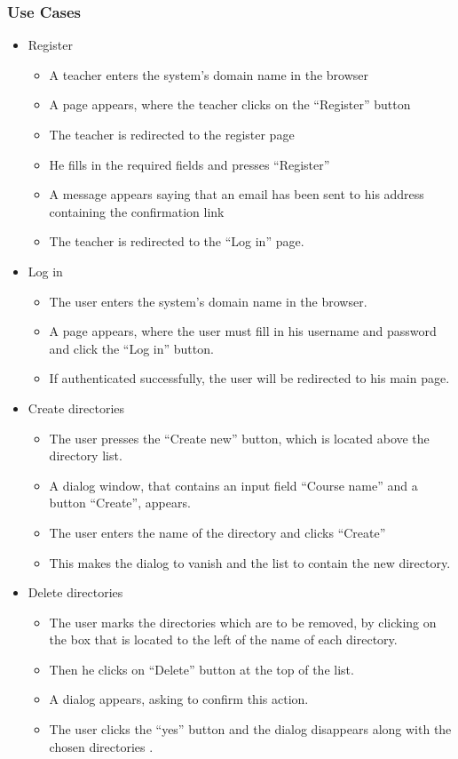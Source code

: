 \subsubsection{Use Cases}
\begin{itemize}
  \item Register
  \begin{itemize}
    \item A teacher enters the system’s domain name in the browser
    \item A page appears, where the teacher clicks on the “Register” button
    \item The teacher is redirected to the register page
    \item He fills in the required fields and presses “Register”
    \item A message appears saying that an email has been sent to his address containing the confirmation link
    \item The teacher is redirected to the “Log in” page.
  \end{itemize}

  \item Log in 
  \begin{itemize}
    \item The user enters the system’s domain name in the browser. 
    \item A page appears, where the user must fill in his username and password and click the “Log in” button. 
    \item If authenticated successfully, the user will be redirected to his main page.
  \end{itemize}

  \item Create directories
  \begin{itemize}
    \item The user presses the “Create new” button, which is located above the directory list.
    \item A dialog window, that contains an input field  “Course name” and a button “Create”, appears.
    \item The user enters the name of  the directory and clicks “Create”
    \item This makes the dialog to vanish and the list to contain the new directory.
  \end{itemize}

  \item Delete directories
  \begin{itemize}
    \item The user marks the directories which are to be removed, by clicking on the box that is located to the left of the name of each directory. 
    \item Then he clicks on “Delete” button at the top of the list.
    \item A dialog appears, asking to confirm this action.
    \item The user clicks the “yes” button and the dialog disappears along with the chosen directories .
  \end{itemize}


\end{itemize}
